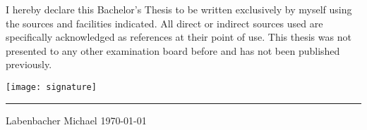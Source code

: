 \addchap{\declarationofauthorshipname}%
\label{chap:decOfAuthorship}%
I hereby %
declare this Bachelor's Thesis to be written exclusively by myself using the sources and facilities indicated. All direct or indirect sources used are specifically acknowledged as references at their point of use. This thesis was not presented to any other examination board before and has not been published previously.%

%
\begin{flushright}%
	\texttt{[image: signature]}\\%
	\rule{0.35\textwidth}{}\par%
	Labenbacher Michael\bigbreak%
	\today%
\end{flushright}%
%